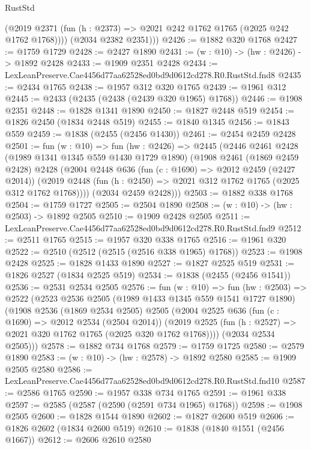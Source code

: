 \begin{lexlean}{RustStd}
\begin{coremodule}
          (@2019 @2371 (fun (h : @2373) => @2021 @242 @1762 @1765 (@2025 @242 @1762 @1768))))
        (@2034 @2382 @2351)))
@2426 := @1882 @320 @1768
@2427 := @1759 @1729
@2428 := @2427 @1890
@2431 := (w : @10) -> (hw : @2426) -> @1892 @2428
@2433 := @1909 @2351 @2428
@2434 := LexLeanPreserve.Cae4456d77aa62528ed0bd9d0612cd278.R0.RustStd.fnd8
@2435 := @2434 @1765
@2438 := @1957 @312 @320 @1765
@2439 := @1961 @312
@2445 := @2433 (@2435 (@2438 (@2439 @320 @1965) @1768))
@2446 := @1908 @2351
@2448 := @1828 @1341 @1890
@2450 := @1827 @2448 @519
@2454 := @1826 @2450 (@1834 @2448 @519)
@2455 := @1840 @1345
@2456 := @1843 @559
@2459 := @1838 (@2455 (@2456 @1430))
@2461 := @2454 @2459 @2428
@2501 := fun (w : @10) =>
  fun (hw : @2426) =>
  @2445
    (@2446
      @2461
      @2428
      (@1989 @1341 @1345 @559 @1430 @1729 @1890)
      (@1908
        @2461
        (@1869 @2459 @2428)
        @2428
        (@2004
          @2448
          @636
          (fun (c : @1690) => @2012 @2459 (@2427 @2014))
          (@2019 @2448 (fun (h : @2450) => @2021 @312 @1762 @1765 (@2025 @312 @1762 @1768))))
        (@2034 @2459 @2428)))
@2503 := @1882 @338 @1768
@2504 := @1759 @1727
@2505 := @2504 @1890
@2508 := (w : @10) -> (hw : @2503) -> @1892 @2505
@2510 := @1909 @2428 @2505
@2511 := LexLeanPreserve.Cae4456d77aa62528ed0bd9d0612cd278.R0.RustStd.fnd9
@2512 := @2511 @1765
@2515 := @1957 @320 @338 @1765
@2516 := @1961 @320
@2522 := @2510 (@2512 (@2515 (@2516 @338 @1965) @1768))
@2523 := @1908 @2428
@2525 := @1828 @1433 @1890
@2527 := @1827 @2525 @519
@2531 := @1826 @2527 (@1834 @2525 @519)
@2534 := @1838 (@2455 (@2456 @1541))
@2536 := @2531 @2534 @2505
@2576 := fun (w : @10) =>
  fun (hw : @2503) =>
  @2522
    (@2523
      @2536
      @2505
      (@1989 @1433 @1345 @559 @1541 @1727 @1890)
      (@1908
        @2536
        (@1869 @2534 @2505)
        @2505
        (@2004
          @2525
          @636
          (fun (c : @1690) => @2012 @2534 (@2504 @2014))
          (@2019 @2525 (fun (h : @2527) => @2021 @320 @1762 @1765 (@2025 @320 @1762 @1768))))
        (@2034 @2534 @2505)))
@2578 := @1882 @734 @1768
@2579 := @1759 @1725
@2580 := @2579 @1890
@2583 := (w : @10) -> (hw : @2578) -> @1892 @2580
@2585 := @1909 @2505 @2580
@2586 := LexLeanPreserve.Cae4456d77aa62528ed0bd9d0612cd278.R0.RustStd.fnd10
@2587 := @2586 @1765
@2590 := @1957 @338 @734 @1765
@2591 := @1961 @338
@2597 := @2585 (@2587 (@2590 (@2591 @734 @1965) @1768))
@2598 := @1908 @2505
@2600 := @1828 @1544 @1890
@2602 := @1827 @2600 @519
@2606 := @1826 @2602 (@1834 @2600 @519)
@2610 := @1838 (@1840 @1551 (@2456 @1667))
@2612 := @2606 @2610 @2580

\end{coremodule}
\end{lexlean}
